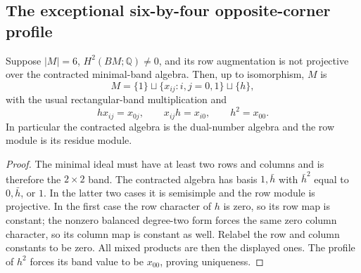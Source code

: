 \subsection{The exceptional six-by-four opposite-corner profile}

\begin{lemma}
\label{C:six-local-source-normal-form}
Suppose $|M|=6$, $H^2(BM;\mathbb Q)\ne0$, and its row
augmentation is not projective over the contracted
minimal-band algebra.  Then, up to isomorphism, $M$ is
\[
 M=\{1\}\sqcup\{x_{ij}:i,j=0,1\}\sqcup\{h\},
\]
with the usual rectangular-band multiplication and
\[
 hx_{ij}=x_{0j},\qquad x_{ij}h=x_{i0},\qquad h^2=x_{00}.
\]
In particular the contracted algebra is the dual-number
algebra and the row module is its residue module.
\end{lemma}
\begin{proof}
The minimal ideal must have at least two rows and columns
and is therefore the $2\times2$ band.  The contracted
algebra has basis $1,\bar h$ with $\bar h^2$ equal to
$0,\bar h$, or $1$.  In the latter two cases it is
semisimple and the row module is projective.
In the first case the row character of $h$ is zero,
so its row map is constant; the nonzero balanced
degree-two form forces the same zero column character,
so its column map is constant as well.
Relabel the row and column constants to be zero.
All mixed products are then the displayed ones.
The profile of $h^2$ forces its band value to be
$x_{00}$, proving uniqueness.
\end{proof}


